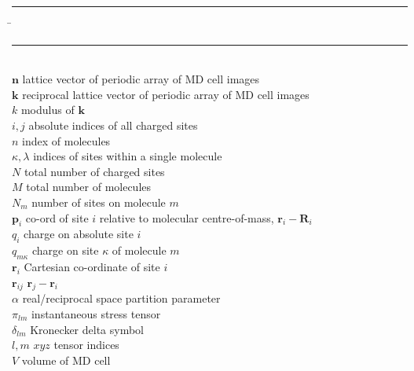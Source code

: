 \documentclass[a4paper,twoside]{report}
\providecommand{\bm}[1]{\mathbf{#1}}
\begin{document}
\begin{tabbing}
\rule{2cm}{0cm} \= \rule{2cm}{0cm} \=\\
\> $\bm{n}$        \> lattice vector of periodic array of MD cell images \\
\> $\bm{k}$        \> reciprocal lattice vector of periodic array of MD cell images \\
\> $k$             \> modulus of $\bm{k}$ \\
\> $i,j$           \> absolute indices of all charged sites \\
\> $n$             \> index of molecules \\
\> $\kappa,\lambda$ \> indices of sites within a single molecule \\
\> $N$             \> total number of charged sites \\
\> $M$             \> total number of molecules \\
\> $N_m$           \> number of sites on molecule $m$ \\
\> $\bm{p}_i$      \> co-ord of site $i$ relative to molecular 
centre-of-mass, $\bm{r}_i - \bm{R}_i$ \\
\> $q_i$           \> charge on absolute site $i$ \\
\> $q_{m\kappa}$   \> charge on site $\kappa$ of molecule $m$ \\
\> $\bm{r}_i$      \> Cartesian co-ordinate of site $i$ \\
\> $\bm{r}_{ij}$   \> $\bm{r}_j - \bm{r}_i$ \\
\> $\alpha$        \> real/reciprocal space partition parameter \\
\> $\pi_{lm}$      \> instantaneous stress tensor \\
\> $\delta_{lm}$   \> Kronecker delta symbol \\
\> $l, m$          \> $xyz$ tensor indices \\
\> $V$             \> volume of MD cell
\end{tabbing}
\end{document}

